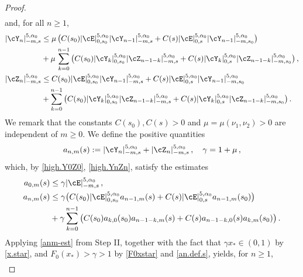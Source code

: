 \documentclass[a4paper,reqno,10pt]{article}
\begin{document}
\begin{proof}
\begin{align}
		 	\end{align}
	and,  for all $n\geq 1$,  
	 	\begin{align}
		 		|\cY_{n}|_{-m,s}^{5,\alpha_{0}} & \leq \mu \, \big( C(s_0)  |\cE|_{0,s_0}^{5,\alpha_{0}}   |\cY_{n-1}|_{-m,s}^{5,\alpha_{0}} + C(s)  |\cE|_{0,s}^{5,\alpha_{0}}   |\cY_{n-1}|_{-m,s_0}^{5,\alpha_{0}} \big) \\
		 		&  + \mu\,  \sum_{k=0}^{n-1} \big( C(s_0) |\cY_{k}|_{0,s_0}^{5,\alpha_{0}}   |\cZ_{n-1-k}|_{-m,s}^{5,\alpha_{0}} + C(s) |\cY_{k}|_{0,s}^{5,\alpha_{0}}   |\cZ_{n-1-k}|_{-m,s_0}^{5,\alpha_{0}} \big) \,, \\
		 			|\cZ_{n}|_{-m,s}^{5,\alpha_{0}} & \leq C(s_0)  |\cE|_{0,s_0}^{5,\alpha_{0}}   |\cY_{n-1}|_{-m,s}^{5,\alpha_{0}} + C(s)  |\cE|_{0,s}^{5,\alpha_{0}}   |\cY_{n-1}|_{-m,s_0}^{5,\alpha_{0}} \\
		 		&  +  \sum_{k=0}^{n-1} \big( C(s_0) |\cY_{k}|_{0,s_0}^{5,\alpha_{0}}   |\cZ_{n-1-k}|_{-m,s}^{5,\alpha_{0}} + C(s) |\cY_{k}|_{0,s}^{5,\alpha_{0}}   |\cZ_{n-1-k}|_{-m,s_0}^{5,\alpha_{0}} \big)  \,. \label{high.YnZn} 
		 	\end{align}
		 	We remark that the constants $C(s_0), C(s)>0$ and $\mu=\mu(\nu_{1},\nu_{2})>0$ are independent of $m\geq 0$. 
		We define the positive quantities
		 	\begin{equation}\label{an.def.s}
		 		a_{n,m}(s) := 	|\cY_{n}|_{-m,s}^{5,\alpha_{0}}  + 	|\cZ_{n}|_{-m,s}^{5,\alpha_{0}} \,, \quad \gamma= 1 + \mu \,,
		 	\end{equation}
		 	which, by \eqref{high.Y0Z0}, \eqref{high.YnZn}, satisfy the estimates
		 	\begin{align}
		 	a_{0,m}(s) & \leq \gamma |\cE|_{-m,s}^{5,\alpha_{0}} \,, \\
		 	a_{n,m}(s) & \leq \gamma \big( C(s_0)  |\cE|_{0,s_0}^{5,\alpha_{0}}  a_{n-1,m}(s) + C(s)  |\cE|_{0,s}^{5,\alpha_{0}}  a_{n-1,m}(s_0) \big) \\
		 		&  +\gamma  \sum_{k=0}^{n-1} \big( C(s_0) a_{k,0}(s_0)  a_{n-1-k,m}(s) + C(s)a_{n-1-k,0}(s) a_{k,m}(s_0) \big) \,. \label{an-s}
		 	\end{align}
            Applying \eqref{anm-est} from Step II,  together with the fact  that $ \gamma x_* \in (0,1)$ by \eqref{x.star}, and $F_0(x_*)>\gamma>1$ by \eqref{F0xstar} and \eqref{an.def.s},
            yields, for $n\geq 1$,
            \begin{align}\label{an-m,s}

\end{align}
\end{proof}
\end{document}
